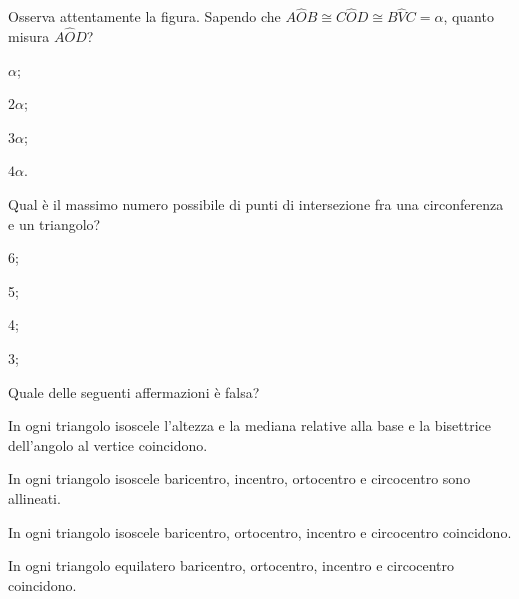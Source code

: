 \noindent\begin{minipage}{0.65\textwidth}\parindent15pt
\begin{esercizio}
\label{ese:5.64}
Osserva attentamente la figura. Sapendo che \(A\widehat{O}B\cong 
C\widehat{O}D\cong B\widehat{V}C=\alpha\), quanto misura 
\(A\widehat{O}D\)?
\begin{multicols}{4}
\begin{enumeratea}
\item \(\alpha\);
\item \(2\alpha\);
\item \(3\alpha\);
\item \(4\alpha\).
\end{enumeratea}
\end{multicols}
\end{esercizio}
\end{minipage}\hfil
\begin{minipage}{0.35\textwidth}
	\centering
\end{minipage}\vspace{5pt}

\begin{esercizio}
\label{ese:5.65}
Qual è il massimo numero possibile di punti di intersezione fra una 
circonferenza e un triangolo?
\begin{multicols}{4}
\begin{enumeratea}
\item 6;
\item 5;
\item 4;
\item 3;
\end{enumeratea}
\end{multicols}
\end{esercizio}

\begin{esercizio}
\label{ese:5.66}
Quale delle seguenti affermazioni è falsa? 
\begin{enumeratea}
\item In ogni triangolo isoscele l'altezza e la mediana relative alla 
base e la bisettrice dell'angolo al vertice coincidono.
\item In ogni triangolo isoscele baricentro, incentro, ortocentro e 
circocentro sono allineati.
\item In ogni triangolo isoscele baricentro, ortocentro, incentro e 
circocentro coincidono.
\item In ogni triangolo equilatero baricentro, ortocentro, incentro e 
circocentro coincidono.
\end{enumeratea}
\end{esercizio}


